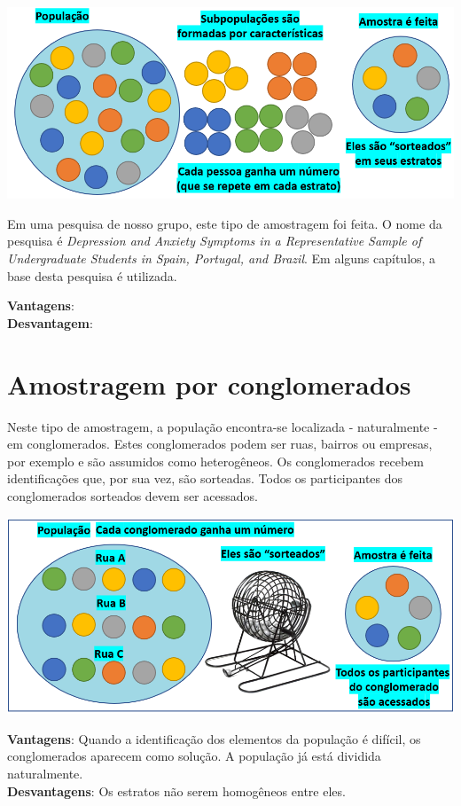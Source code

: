 \documentclass[
]{book}
\begin{document}
\includegraphics{./img/cap_a_estratificada.png}

Em uma pesquisa de nosso grupo, este tipo de amostragem foi feita. O
nome da pesquisa é \emph{Depression and Anxiety Symptoms in a
Representative Sample of Undergraduate Students in Spain, Portugal, and
Brazil}. Em alguns capítulos, a base desta pesquisa é utilizada.

\textbf{Vantagens}:\\
\textbf{Desvantagem}:

\hypertarget{amostragem-por-conglomerados}{%
\section{Amostragem por
conglomerados}\label{amostragem-por-conglomerados}}

Neste tipo de amostragem, a população encontra-se localizada -
naturalmente - em conglomerados. Estes conglomerados podem ser ruas,
bairros ou empresas, por exemplo e são assumidos como heterogêneos. Os
conglomerados recebem identificações que, por sua vez, são sorteadas.
Todos os participantes dos conglomerados sorteados devem ser acessados.

\includegraphics{./img/cap_a_conglomerado.png}

\textbf{Vantagens}: Quando a identificação dos elementos da população é
difícil, os conglomerados aparecem como solução. A população já está
dividida naturalmente.\\
\textbf{Desvantagens}: Os estratos não serem homogêneos entre eles.
\end{document}
